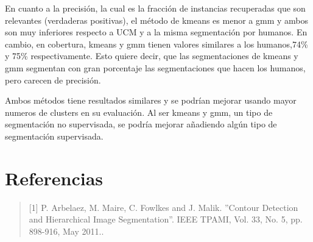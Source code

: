 \documentclass[10pt,twocolumn,letterpaper]{article}
\begin{document}
En cuanto a la precisión, la cual es la fracción de instancias recuperadas que son relevantes (verdaderas positivas), el método de kmeans es menor a gmm y ambos son muy inferiores respecto a UCM  y a la misma segmentación por humanos. En cambio, en cobertura, kmeans y gmm tienen valores similares a los humanos,74\% y 75\% respectivamente. Esto quiere decir, que las segmentaciones de kmeans y gmm segmentan con gran porcentaje las segmentaciones que hacen los humanos, pero carecen de precisión. 

Ambos métodos tiene resultados similares y se podrían mejorar usando mayor numeros de clusters en su evaluación. Al ser kmeans y gmm, un tipo de segmentación no supervisada, se podría mejorar añadiendo algún tipo de segmentación supervisada.

\section{Referencias}

\begin{quote}

   [1] P. Arbelaez, M. Maire, C. Fowlkes and J. Malik. ''Contour Detection and Hierarchical Image Segmentation''. IEEE TPAMI, Vol. 33, No. 5, pp. 898-916, May 2011..
\end{quote}

{\small


}
\end{document}

